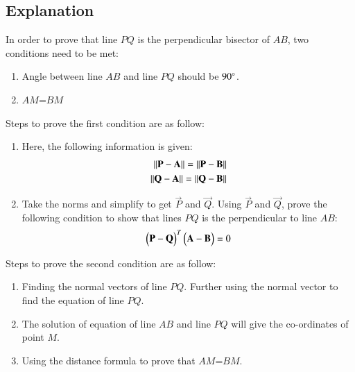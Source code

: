 \documentclass[journal,12pt,twocolumn]{IEEEtran}
\begin{document}
\subsection{Explanation}
In order to prove that line $PQ $ is the perpendicular bisector of $AB$, two conditions need to be met:
\begin{enumerate}
    \item Angle between line $AB$ and line $PQ$ should be $90\degree$.
    \item $AM$=$BM$
\end{enumerate}
Steps to prove the first condition are as follow:
\begin{enumerate}
    \item Here, the following information is given:
    \begin{align}
    \left\lVert\mathbf{P}-\mathbf{A}\right\rVert=\left\lVert\mathbf{P}-\mathbf{B}\right\rVert \label{eq2.2}\\
    \left\lVert\mathbf{Q}-\mathbf{A}\right\rVert=\left\lVert\mathbf{Q}-\mathbf{B}\right\rVert
\end{align}
    \item Take the norms and simplify to get $\vec{P}$ and $\vec{Q}$. Using $\vec{P}$ and $\vec{Q}$, prove the following condition to show that lines $PQ$ is the perpendicular to line $AB$:
    \begin{align}
    \begin{pmatrix}\mathbf{P}-\mathbf{Q}\end{pmatrix}^T\begin{pmatrix}\mathbf{A}-\mathbf{B}\end{pmatrix}=0
    \end{align}
\end{enumerate}
Steps to prove the second condition are as follow:
\begin{enumerate}
    \item Finding the normal vectors of line $PQ$. Further using the normal vector to find the equation of line $PQ$. 
    \item The solution of equation of line $AB$ and line $PQ$ will give the co-ordinates of point $M$. 
    \item Using the distance formula to prove that $AM$=$BM$.
\end{enumerate}
\end{document}
